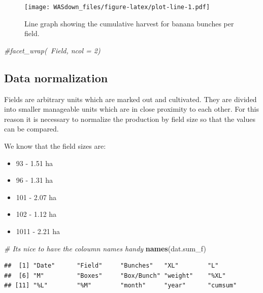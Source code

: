 \documentclass[]{book}
\newenvironment{Shaded}{\begin{snugshade}}{\end{snugshade}}
\newcommand{\KeywordTok}[1]{\textcolor[rgb]{0.13,0.29,0.53}{\textbf{{#1}}}}
\newcommand{\CommentTok}[1]{\textcolor[rgb]{0.56,0.35,0.01}{\textit{{#1}}}}
\newcommand{\NormalTok}[1]{{#1}}
\providecommand{\tightlist}{%
  \setlength{\itemsep}{0pt}\setlength{\parskip}{0pt}}
\theoremstyle{definition}
\theoremstyle{definition}
\theoremstyle{remark}
\begin{document}
\begin{figure}[htbp]
\centering
\texttt{[image: WASdown\_files/figure-latex/plot-line-1.pdf]}
\caption{\label{fig:plot-line}Line graph showing the cumulative harvest for
banana bunches per field.}
\end{figure}

\begin{Shaded}
\begin{Highlighting}[]
  \CommentTok{#facet_wrap(~Field, ncol = 2)}
\end{Highlighting}
\end{Shaded}

\subsection{Data normalization}\label{data-normalization}

Fields are arbitrary units which are marked out and cultivated. They are
divided into smaller manageable units which are in close proximity to
each other. For this reason it is necessary to normalize the production
by field size so that the values can be compared.

We know that the field sizes are:

\begin{itemize}
\tightlist
\item
  93 - 1.51 ha
\item
  96 - 1.31 ha
\item
  101 - 2.07 ha
\item
  102 - 1.12 ha
\item
  1011 - 2.21 ha
\end{itemize}

\begin{Shaded}
\begin{Highlighting}[]
\CommentTok{# Its nice to have the coloumn names handy}
\KeywordTok{names}\NormalTok{(dat.sum_f)}
\end{Highlighting}
\end{Shaded}

\begin{verbatim}
##  [1] "Date"      "Field"     "Bunches"   "XL"        "L"        
##  [6] "M"         "Boxes"     "Box/Bunch" "weight"    "%XL"      
## [11] "%L"        "%M"        "month"     "year"      "cumsum"
\end{verbatim}
\end{document}
